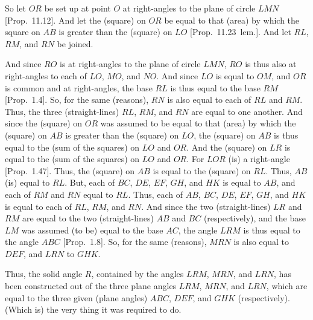 \begin{Parallel}{}{}
{So let $OR$ be set up at point $O$ at right-angles to the plane
of circle $LMN$ [Prop.~11.12]. And let the (square) on $OR$ be equal to that (area) by which the square on $AB$ is greater than the
(square) on $LO$ [Prop.~11.23~lem.]. And let $RL$, $RM$, and $RN$ be joined.

And since $RO$ is at right-angles to the plane of circle $LMN$, $RO$
is thus also at right-angles to each of $LO$, $MO$, and $NO$. And since
$LO$ is equal to $OM$, and $OR$ is common and at right-angles,
the base $RL$ is thus equal to the base $RM$ [Prop.~1.4]. So, for the same (reasons), $RN$ is also equal to
each of $RL$ and $RM$. Thus, the three (straight-lines) $RL$, $RM$,
and $RN$ are equal to one another. And since the (square) on $OR$
was assumed to be equal to that (area) by which the (square) on $AB$
is greater than the (square) on $LO$, the (square) on $AB$ is thus equal
to the (sum of the squares) on $LO$ and $OR$. And the (square) on 
$LR$ is equal to the (sum of the squares) on $LO$ and $OR$. For $LOR$ (is) a right-angle  [Prop.~1.47]. Thus,
the (square) on $AB$ is equal to the (square) on $RL$. Thus, $AB$ (is)
equal to $RL$. But, each of $BC$, $DE$, $EF$, $GH$, and $HK$
is equal to $AB$, and each of $RM$ and $RN$ equal to $RL$. Thus,
each of $AB$, $BC$, $DE$, $EF$, $GH$, and $HK$ is equal to each of
$RL$, $RM$, and $RN$. And since the two (straight-lines)
$LR$ and $RM$ are equal to the two (straight-lines) $AB$ and $BC$ (respectively), and the base $LM$ was assumed (to be) equal to the
base $AC$, the angle $LRM$ is thus equal to the angle $ABC$
[Prop.~1.8]. So, for the same (reasons), $MRN$
is also equal to $DEF$, and $LRN$ to $GHK$.

Thus, the solid angle $R$, contained by the angles $LRM$, $MRN$, and $LRN$,  has been constructed out of the three plane
angles $LRM$, $MRN$, and $LRN$, which are equal to the three
given (plane angles) $ABC$, $DEF$, and $GHK$ (respectively). 
(Which is) the very thing it was required to do.}
\end{Parallel}

